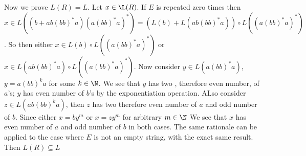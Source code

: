 \documentclass[11pt]{article}
\begin{document}
\begin{solution}
  Now we prove $L(R) = L$. Let $x\in \L(R)$. If $E$ is repeated zero times then $x\in L((b+ab(bb)^*a)(a(bb)^*a)^*) = (L(b) + L(ab(bb)^*a)) \circ L((a(bb)^*a)^*)$. So then either $x\in L(b)\circ L((a(bb)^*a)^*)$ or $x\in L(ab(bb)^*a)\circ L((a(bb)^*a)^*)$. Now consider $y\in L(a(bb)^*a)$, $y = a(bb)^ka$ for some $k\in \N$. We see that $y$ has two , therefore even number, of $a$'s; $y$ has even number of $b$'s by the exponentiation operation. ALso consider $z\in L(ab(bb)^ka)$, then $z$ has two therefore even number of $a$ and odd number of $b$. Since either $x = by^m$ or $x=zy^m$ for arbitrary $m\in\N$ We see that $x$ has even number of $a$ and odd number of $b$ in both cases. The same rationale can be applied to the case where $E$ is not an empty string, with the exact same result. Then $L(R)\subseteq L$\\

\end{solution}
\end{document}
